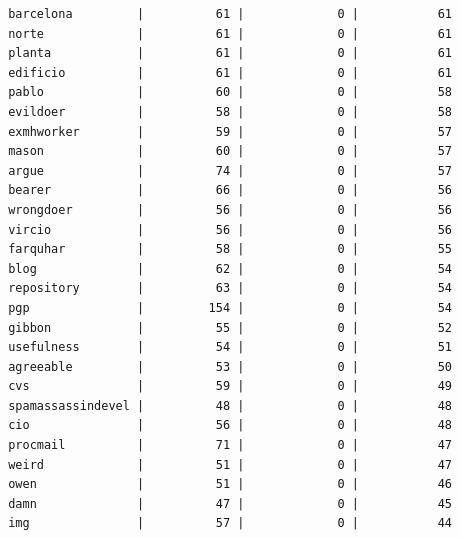\documentclass[a4paper,12pt]{article}
\begin{document}
\begin{verbatim}
 barcelona         |          61 |             0 |           61
 norte             |          61 |             0 |           61
 planta            |          61 |             0 |           61
 edificio          |          61 |             0 |           61
 pablo             |          60 |             0 |           58
 evildoer          |          58 |             0 |           58
 exmhworker        |          59 |             0 |           57
 mason             |          60 |             0 |           57
 argue             |          74 |             0 |           57
 bearer            |          66 |             0 |           56
 wrongdoer         |          56 |             0 |           56
 vircio            |          56 |             0 |           56
 farquhar          |          58 |             0 |           55
 blog              |          62 |             0 |           54
 repository        |          63 |             0 |           54
 pgp               |         154 |             0 |           54
 gibbon            |          55 |             0 |           52
 usefulness        |          54 |             0 |           51
 agreeable         |          53 |             0 |           50
 cvs               |          59 |             0 |           49
 spamassassindevel |          48 |             0 |           48
 cio               |          56 |             0 |           48
 procmail          |          71 |             0 |           47
 weird             |          51 |             0 |           47
 owen              |          51 |             0 |           46
 damn              |          47 |             0 |           45
 img               |          57 |             0 |           44
	\end{verbatim}
\end{document}
